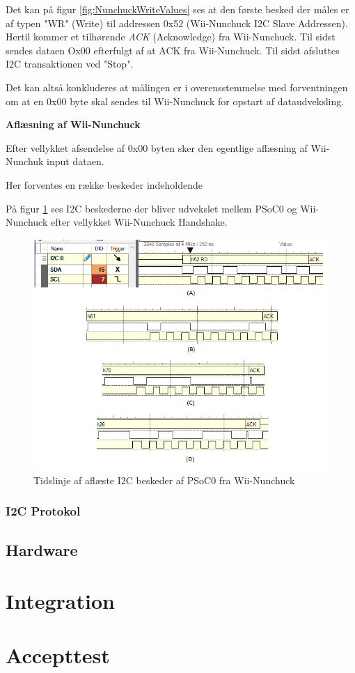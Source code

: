 Det kan på figur \ref{fig:NunchuckWriteValues} ses at den første besked der måles er af typen "WR" (Write) til addressen 0x52 (Wii-Nunchuck I2C Slave Addressen). Hertil kommer et tilhørende \textit{ACK} (Acknowledge) fra Wii-Nunchuck. Til sidst sendes dataen Ox00 efterfulgt af at ACK fra Wii-Nunchuck. Til sidst afsluttes I2C transaktionen ved "Stop".

Det kan altså konkluderes at målingen er i overensstemmelse med forventningen om at en 0x00 byte skal sendes til Wii-Nunchuck for opstart af dataudveksling.

\textbf{Aflæsning af Wii-Nunchuck}

Efter vellykket afsendelse af 0x00 byten sker den egentlige aflæsning af Wii-Nunchuk input dataen.

Her forventes en række beskeder indeholdende 

På figur \ref{fig:NunchuckReadValues} ses I2C beskederne der bliver udvekslet mellem PSoC0 og Wii-Nunchuck efter vellykket Wii-Nunchuck Handshake. 

\begin{figure}[H]
	\centering
	\includegraphics[width=\textwidth]{Test/images/readvaluesEdited.png}
	\caption{Tidslinje af aflæste I2C beskeder af PSoC0 fra Wii-Nunchuck}
	\label{fig:NunchuckReadValues}
\end{figure}

\subsubsection{I2C Protokol}

\subsection{Hardware}

\section{Integration}

\section{Accepttest}